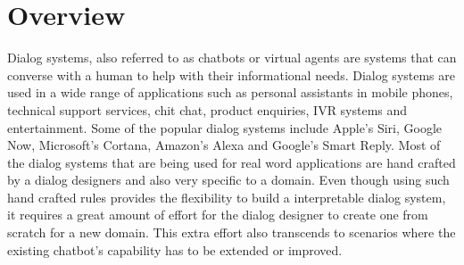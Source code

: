 \section{Overview}
Dialog systems, also referred to as chatbots or virtual agents are systems that can converse with a human to help with their informational needs. Dialog systems are used in a wide range of applications such as personal assistants in mobile phones, technical support services, chit chat, product enquiries, IVR systems and entertainment. Some of the popular dialog systems include Apple's Siri, Google Now, Microsoft's Cortana, Amazon's Alexa and Google's Smart Reply. Most of the dialog systems that are being used for real word applications are hand crafted by a dialog designers and also very specific to a domain. Even though using such hand crafted rules provides the flexibility to build a interpretable dialog system, it requires a great amount of effort for the dialog designer to create one from scratch for a new domain. This extra effort also transcends to scenarios where the existing chatbot's capability has to be extended or improved.



